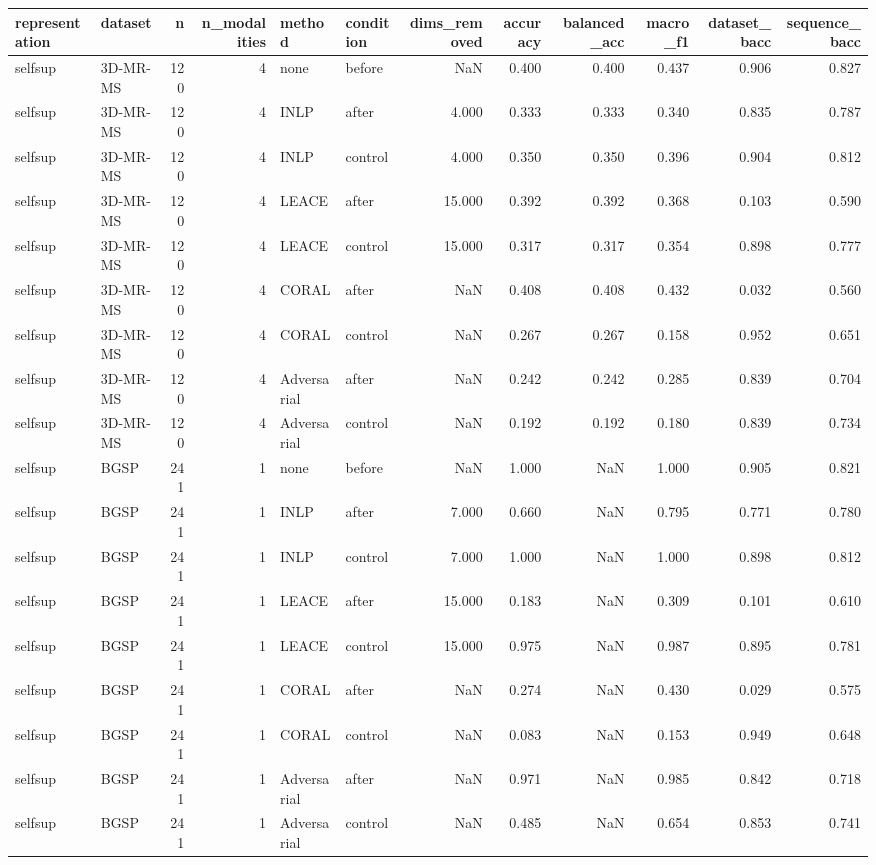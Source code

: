 \begin{tabular}{llrrllrrrrrr}
\toprule
representation & dataset & n & n\_modalities & method & condition & dims\_removed & accuracy & balanced\_acc & macro\_f1 & dataset\_bacc & sequence\_bacc \\
\midrule
selfsup & 3D-MR-MS & 120 & 4 & none & before & NaN & 0.400 & 0.400 & 0.437 & 0.906 & 0.827 \\
selfsup & 3D-MR-MS & 120 & 4 & INLP & after & 4.000 & 0.333 & 0.333 & 0.340 & 0.835 & 0.787 \\
selfsup & 3D-MR-MS & 120 & 4 & INLP & control & 4.000 & 0.350 & 0.350 & 0.396 & 0.904 & 0.812 \\
selfsup & 3D-MR-MS & 120 & 4 & LEACE & after & 15.000 & 0.392 & 0.392 & 0.368 & 0.103 & 0.590 \\
selfsup & 3D-MR-MS & 120 & 4 & LEACE & control & 15.000 & 0.317 & 0.317 & 0.354 & 0.898 & 0.777 \\
selfsup & 3D-MR-MS & 120 & 4 & CORAL & after & NaN & 0.408 & 0.408 & 0.432 & 0.032 & 0.560 \\
selfsup & 3D-MR-MS & 120 & 4 & CORAL & control & NaN & 0.267 & 0.267 & 0.158 & 0.952 & 0.651 \\
selfsup & 3D-MR-MS & 120 & 4 & Adversarial & after & NaN & 0.242 & 0.242 & 0.285 & 0.839 & 0.704 \\
selfsup & 3D-MR-MS & 120 & 4 & Adversarial & control & NaN & 0.192 & 0.192 & 0.180 & 0.839 & 0.734 \\
selfsup & BGSP & 241 & 1 & none & before & NaN & 1.000 & NaN & 1.000 & 0.905 & 0.821 \\
selfsup & BGSP & 241 & 1 & INLP & after & 7.000 & 0.660 & NaN & 0.795 & 0.771 & 0.780 \\
selfsup & BGSP & 241 & 1 & INLP & control & 7.000 & 1.000 & NaN & 1.000 & 0.898 & 0.812 \\
selfsup & BGSP & 241 & 1 & LEACE & after & 15.000 & 0.183 & NaN & 0.309 & 0.101 & 0.610 \\
selfsup & BGSP & 241 & 1 & LEACE & control & 15.000 & 0.975 & NaN & 0.987 & 0.895 & 0.781 \\
selfsup & BGSP & 241 & 1 & CORAL & after & NaN & 0.274 & NaN & 0.430 & 0.029 & 0.575 \\
selfsup & BGSP & 241 & 1 & CORAL & control & NaN & 0.083 & NaN & 0.153 & 0.949 & 0.648 \\
selfsup & BGSP & 241 & 1 & Adversarial & after & NaN & 0.971 & NaN & 0.985 & 0.842 & 0.718 \\
selfsup & BGSP & 241 & 1 & Adversarial & control & NaN & 0.485 & NaN & 0.654 & 0.853 & 0.741 \\

\end{tabular}
